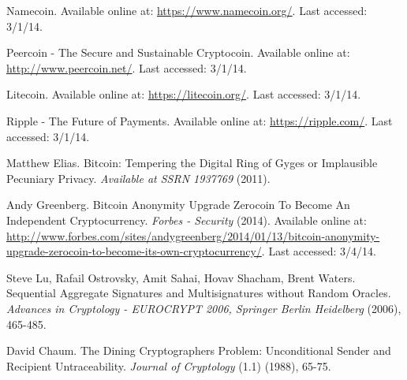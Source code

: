 \documentclass[conference]{IEEEtran}
\begin{document}
\begin{thebibliography}{1}
 Namecoin. Available online at: \url{https://www.namecoin.org/}. Last accessed: 3/1/14. 

 Peercoin - The Secure and Sustainable Cryptocoin. Available online at: \url{http://www.peercoin.net/}. Last accessed: 3/1/14. 

 Litecoin. Available online at: \url{https://litecoin.org/}. Last accessed: 3/1/14.

 Ripple - The Future of Payments. Available online at: \url{https://ripple.com/}. Last accessed: 3/1/14.

 Matthew Elias. Bitcoin: Tempering the Digital Ring of Gyges or Implausible Pecuniary Privacy. \emph{Available at SSRN 1937769} (2011).

 Andy Greenberg. Bitcoin Anonymity Upgrade Zerocoin To Become An Independent Cryptocurrency. \emph{Forbes - Security} (2014). Available online at: \url{http://www.forbes.com/sites/andygreenberg/2014/01/13/bitcoin-anonymity-upgrade-zerocoin-to-become-its-own-cryptocurrency/}. Last accessed: 3/4/14. 

 Steve Lu, Rafail Ostrovsky, Amit Sahai, Hovav Shacham, Brent Waters. Sequential Aggregate Signatures and Multisignatures without Random Oracles. \emph{Advances in Cryptology - EUROCRYPT 2006, Springer Berlin Heidelberg} (2006), 465-485.

 David Chaum. The Dining Cryptographers Problem: Unconditional Sender and Recipient Untraceability. \emph{Journal of Cryptology} (1.1) (1988), 65-75.

\end{thebibliography}




\end{document}
